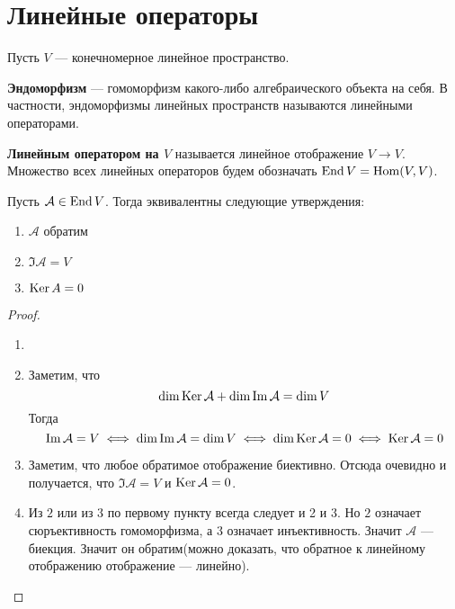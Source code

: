 \documentclass[../main.tex]{subfiles}
\begin{document}
\section{Линейные операторы}
Пусть $V$ --- конечномерное линейное пространство.

\begin{definition}
  \textbf{Эндоморфизм} --- гомоморфизм какого-либо алгебраического объекта на себя. В частности, эндоморфизмы линейных пространств называются линейными операторами.
\end{definition}

\begin{definition}
  \textbf{Линейным оператором на $V$} называется линейное отображение $V \to V$. Множество всех линейных операторов будем обозначать $\operatorname{End} V = \operatorname{Hom}(V, V)$.
\end{definition}

\begin{theorem-non}
\label{non:7.5}
  Пусть $\mathcal{A} \in \operatorname{End} V$. Тогда эквивалентны следующие утверждения:
  \begin{enumerate}
    \item $\mathcal{A}$ обратим
    \item $\Im \mathcal{A} = V$
    \item $\operatorname{Ker} A = 0$
  \end{enumerate}
\end{theorem-non}
\begin{proof}
  \begin{enumerate}
    \item[]
    \item[] 
    Заметим, что
    $$
      \dim \operatorname{Ker} \mathcal{A} + \dim \operatorname{Im} \mathcal{A} = \dim V
    $$
    Тогда
      $$
        \operatorname{Im} \mathcal{A} = V \iff \dim \operatorname{Im} \mathcal{A} = \dim V \iff \dim \operatorname{Ker} \mathcal{A} = 0 \iff \operatorname{Ker} \mathcal{A} = 0
      $$
    \item[]  \vphantom{\Big |}
    Заметим, что любое обратимое отображение биективно. Отсюда очевидно и получается, что $\Im \mathcal{A} = V$ и $\operatorname{Ker} \mathcal{A} = 0$.
    \item[]  \vphantom{\Big |}
    Из $2$ или из $3$ по первому пункту всегда следует и 2 и 3. Но $2$ означает сюръективность гомоморфизма, а $3$ означает инъективность. Значит $\mathcal{A}$ --- биекция. Значит он обратим(можно доказать, что обратное к линейному отображению отображение --- линейно).
  \end{enumerate}
\end{proof}
\end{document}
